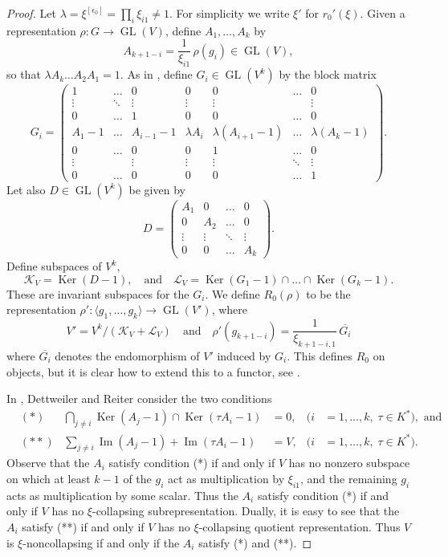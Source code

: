 \documentclass{amsart}
\theoremstyle{plain}
\theoremstyle{definition}
\theoremstyle{remark}
\DeclareMathOperator{\GL}{GL}
\DeclareMathOperator{\Ker}{Ker}
\DeclareMathOperator{\Ima}{Im}
\begin{document}
\begin{proof}
Let $\lambda = \xi^{[\epsilon_0]} = \prod_i \xi_{i1} \neq 1$.
For simplicity we write $\xi'$ for $r_0'(\xi)$.
Given a representation $\rho:G\to\GL(V)$, define $A_1,\dots,A_k$
by
\[
A_{k+1-i} = \frac{1}{\xi_{i1}}\, \rho(g_i) \in \GL(V),
\]
so that $\lambda A_k \dots A_2 A_1 = 1$.
As in \cite{DR}, define $G_i\in \GL(V^k)$ by the block matrix
\[
G_i = \begin{pmatrix}
1 & \dots & 0 & 0 & 0 & \dots & 0 \\
\vdots & \ddots & \vdots & \vdots & \vdots & & \vdots \\
0 & \dots & 1 & 0 & 0 & \dots & 0 \\
A_1-1 & \dots & A_{i-1}-1 & \lambda A_i & \lambda(A_{i+1}-1) & \dots & \lambda(A_k-1) \\
0 & \dots & 0 & 0 & 1 & \dots & 0 \\
\vdots & & \vdots & \vdots & \vdots & \ddots & \vdots \\
0 & \dots & 0 & 0 & 0 & \dots & 1
\end{pmatrix}.
\]
Let also $D\in \GL(V^k)$ be given by
\[
D =\begin{pmatrix}
A_1 & 0 & \dots & 0 \\
0 & A_2 & \dots & 0 \\
\vdots & \vdots & \ddots & \vdots \\
0 & 0 & \dots & A_k
\end{pmatrix}.
\]
Define subspaces of $V^k$,
\[
\mathcal{K}_V = \Ker(D-1),
\quad\text{and}\quad
\mathcal{L}_V = \Ker(G_1-1)\cap \dots \cap \Ker(G_k-1).
\]
These are invariant subspaces for the $G_i$.
We define $R_0(\rho)$ to be the representation $\rho':\langle g_1,\dots,g_k\rangle \to\GL(V')$,
where
\[
V' = V^k / (\mathcal{K}_V+\mathcal{L}_V)
\quad\text{and}\quad
\rho'(g_{k+1-i}) = \frac{1}{\xi_{k+1-i,1}} \, \overline{G_i}
\]
where $\overline{G_i}$ denotes the endomorphism of $V'$ induced by $G_i$.
This defines $R_0$ on objects, but it is clear how to extend this
to a functor, see \cite[Proposition 2.6]{DR}.

In \cite[\S 3]{DR}, Dettweiler and Reiter consider the two conditions
%
\begin{align*}
&(*)  & \bigcap_{j\neq i} \Ker(A_j - 1) \cap \Ker(\tau A_i-1) &= 0, & (i&=1,\dots,k, \; \tau\in K^*), \text{ and}
\\
&(**) & \sum_{j\neq i} \Ima(A_j-1) + \Ima(\tau A_i-1)         &= V, & (i&=1,\dots,k, \; \tau\in K^*).
\end{align*}
%
Observe that the $A_i$ satisfy condition (*) if and only if $V$ has no
nonzero subspace on which at least $k-1$ of the
$g_i$ act as multiplication by $\xi_{i1}$, and the remaining $g_i$ acts
as multiplication by some scalar. Thus the $A_i$ satisfy condition (*)
if and only if $V$ has no $\xi$-collapsing subrepresentation.
Dually,
it is easy to see that the $A_i$ satisfy (**) if and only if $V$ has no
$\xi$-collapsing quotient representation. Thus $V$ is $\xi$-noncollapsing if and only if
the $A_i$ satisfy (*) and (**).


\end{proof}
\end{document}
